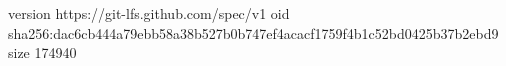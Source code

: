 version https://git-lfs.github.com/spec/v1
oid sha256:dac6cb444a79ebb58a38b527b0b747ef4acacf1759f4b1c52bd0425b37b2ebd9
size 174940
